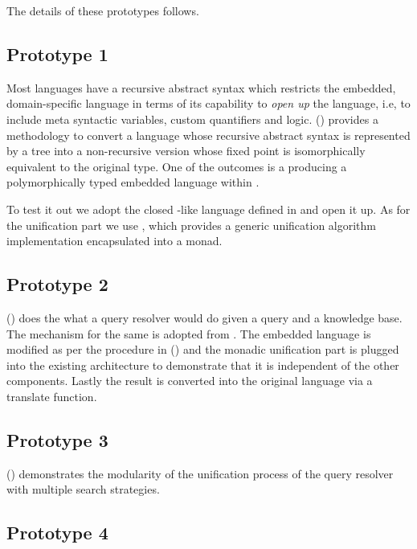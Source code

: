 \documentclass[thesis-solanki.tex]{subfiles}
\begin{document}
The details of these prototypes follows.

\subsection{Prototype 1}

Most languages have a recursive abstract syntax which restricts the embedded, domain-specific language
 in terms of its capability to \textit{open up} the language, i.e, to
include meta syntactic variables, custom quantifiers and logic.
() provides a methodology to convert a language whose recursive abstract
syntax is represented by a tree into a non-recursive version whose fixed point is isomorphically equivalent to the
original type.
One of the outcomes is a producing a polymorphically typed embedded language within .

To test it out we adopt the closed -like language defined in \cite{prolog-lib} and open it up.
As for the unification part we use \cite{unification-fd-lib}, which provides a generic unification algorithm
implementation encapsulated into a monad.


\subsection{Prototype 2}

() does the what a  query resolver would do given a query
and a knowledge base.
The mechanism for the same is adopted from \cite{prolog-lib}.
The embedded language is modified as per the procedure in () and the monadic
unification part is plugged into the existing architecture to demonstrate that it is independent of the other
components.
Lastly the result is converted into the original language via a translate function.

\subsection{Prototype 3}

() demonstrates the modularity of the unification process of the query
resolver with multiple search strategies.

\subsection{Prototype 4}
\end{document}
